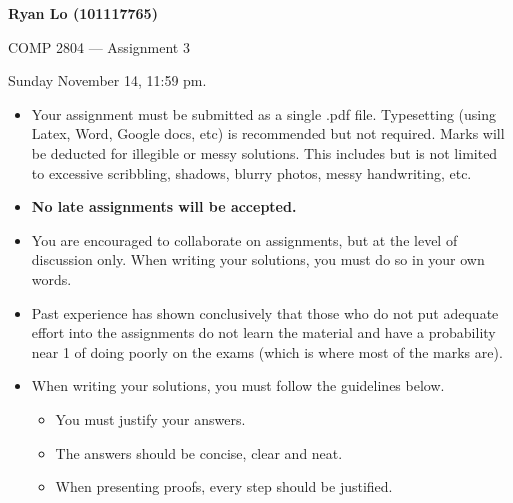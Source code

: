 \documentclass[12pt]{article}
\begin{document}
\begin{center} \Large\bf
Ryan Lo (101117765)

COMP 2804 --- Assignment 3
\end{center}

 Sunday November 14, 11:59 pm.

\vspace{0.5em}


\begin{itemize}
	\item Your assignment must be submitted as a single .pdf file. Typesetting (using Latex, Word, Google docs, etc) is recommended but not required. Marks will be deducted for illegible or messy solutions. This includes but is not limited to excessive scribbling, shadows, blurry photos, messy handwriting, etc.   
	\item {\bf No late assignments will be accepted. } 
	\item You are encouraged to collaborate on assignments, but at the level 
	of discussion only. When writing your solutions, you must do so 
	in your own words. 
	\item Past experience has shown conclusively that those who do not put 
	adequate effort into the assignments do not learn the material and have a probability near 1 of doing poorly on the exams (which is where most of the marks are).
	\item When writing your solutions, you must follow the guidelines below.
	\begin{itemize}
		\item You must justify your answers. 
		\item The answers should be concise, clear and neat.
		\item When presenting proofs, every step should be justified.
	\end{itemize}
\end{itemize}

\vspace{1em} 
\end{document}
